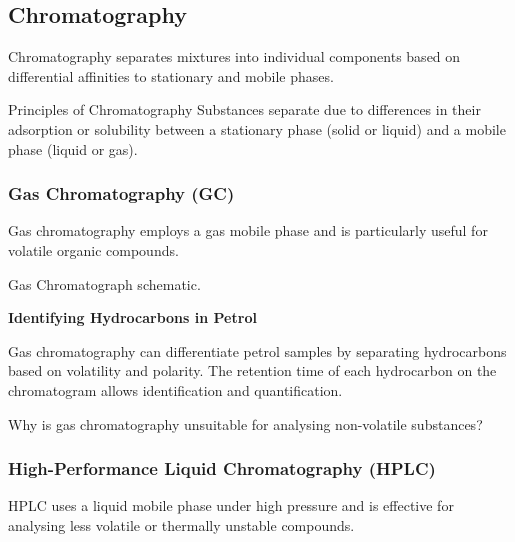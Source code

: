 \FloatBarrier

\subsection{Chromatography}
\FloatBarrier
\FloatBarrier
\FloatBarrier

Chromatography separates mixtures into individual components based on differential affinities to stationary and mobile phases.

\begin{keyconcept}{Principles of Chromatography}
Substances separate due to differences in their adsorption or solubility between a stationary phase (solid or liquid) and a mobile phase (liquid or gas).
\end{keyconcept}

\subsubsection{Gas Chromatography (GC)}

Gas chromatography employs a gas mobile phase and is particularly useful for volatile organic compounds.

\begin{marginfigure}[0pt][0pt][0pt]
\caption{Gas Chromatograph schematic.}
\label{fig:gc-setup}
\end{marginfigure}

\begin{example}
\textbf{Identifying Hydrocarbons in Petrol}

Gas chromatography can differentiate petrol samples by separating hydrocarbons based on volatility and polarity. The retention time of each hydrocarbon on the chromatogram allows identification and quantification.
\end{example}

\begin{stopandthink}
Why is gas chromatography unsuitable for analysing non-volatile substances?
\end{stopandthink}

\subsubsection{High-Performance Liquid Chromatography (HPLC)}

HPLC uses a liquid mobile phase under high pressure and is effective for analysing less volatile or thermally unstable compounds.


